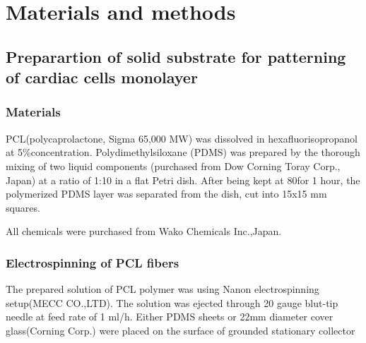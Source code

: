 \section{Materials and methods}
\label{sec:methods}

\subsection{Preparartion of solid substrate for patterning of cardiac cells monolayer}
\subsubsection{Materials}
	\label{sec:specimen_preparation_electrospinning}


PCL(polycaprolactone, Sigma 65,000 MW) was dissolved in hexafluorisopropanol at 5\%concentration.  
Polydimethylsiloxane (PDMS) was prepared by the thorough mixing of two liquid components (purchased from Dow Corning Toray Corp., Japan) at a ratio of 1:10 in a flat Petri dish. After being kept at 80\gc\space for 1 hour, the polymerized PDMS layer was separated from the dish, cut into 15x15 mm squares.

All chemicals were purchased from Wako Chemicals Inc.,Japan.
\subsubsection{Electrospinning of PCL fibers}
The prepared solution of PCL polymer was using Nanon electrospinning setup(MECC CO.,LTD). The solution was ejected through 20 gauge blut-tip needle at feed rate of 1 ml/h. Either PDMS sheets or 22mm diameter cover glass(Corning Corp.) were placed on the surface of grounded stationary collector  

